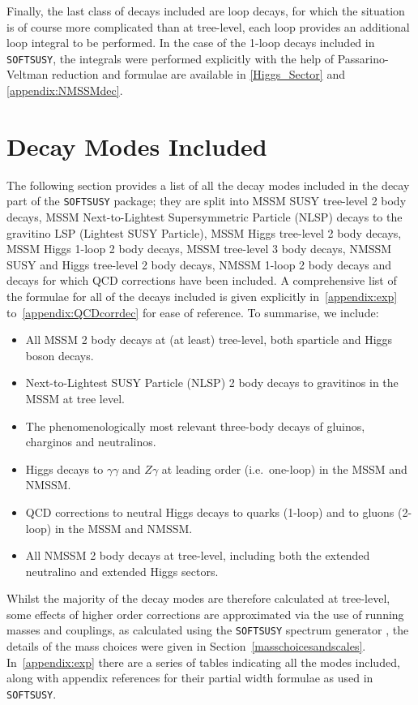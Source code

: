 \documentclass[final,3p,times]{elsarticle}
\begin{document}
Finally, the last class of decays included are loop decays, for which the situation is of course more complicated than at tree-level,
each loop provides an additional loop integral to be performed. In the case
of the 1-loop decays included in {\tt SOFTSUSY},  the integrals were performed
explicitly with the help of Passarino-Veltman reduction \cite{Passarino:1979} and formulae are available in \ref{Higgs_Sector} and \ref{appendix:NMSSMdec}.

\section{Decay Modes Included \label{sec:list}}
The following section provides a list of all the decay modes included in the
decay part of the {\tt SOFTSUSY} package; they are split into MSSM SUSY
tree-level 2 body decays, MSSM Next-to-Lightest Supersymmetric Particle (NLSP) decays
to the gravitino LSP (Lightest SUSY Particle), MSSM Higgs tree-level 2 body decays, MSSM Higgs
1-loop 2 body decays, MSSM tree-level 3 body decays,  NMSSM SUSY and Higgs tree-level 2 body decays, NMSSM
1-loop 2 body decays and decays for which QCD corrections have been
included. A comprehensive list of the formulae for all of the decays included
is given explicitly in~\ref{appendix:exp} to~\ref{appendix:QCDcorrdec} for
ease of reference. To summarise, we include:
\begin{itemize}
\item All MSSM 2 body decays at (at least) tree-level, both sparticle and
  Higgs boson decays. 
\item Next-to-Lightest SUSY Particle (NLSP) 2 body decays to gravitinos in the
  MSSM at tree level.
\item The phenomenologically most relevant three-body decays of gluinos, charginos and neutralinos.
\item Higgs decays to $\gamma\gamma$ and $Z\gamma$ at leading order (i.e.\ one-loop) in the MSSM and NMSSM.
\item QCD corrections to neutral Higgs decays to quarks (1-loop) and to gluons (2-loop) in the MSSM and NMSSM.
\item All NMSSM 2 body decays at tree-level, including both the extended neutralino and extended Higgs sectors.
\end{itemize}

Whilst the majority of the decay modes are therefore calculated at tree-level,
some effects of higher order corrections are approximated via the use of
running masses and couplings, as calculated using the {\tt SOFTSUSY} spectrum
generator \cite{Allanach:2001kg}, the details of the mass choices were given
in Section~\ref{masschoicesandscales}. In~\ref{appendix:exp} there are a
series of tables indicating all the modes included, along with appendix references for
their partial width formulae as used in {\tt SOFTSUSY}.  
\end{document}
